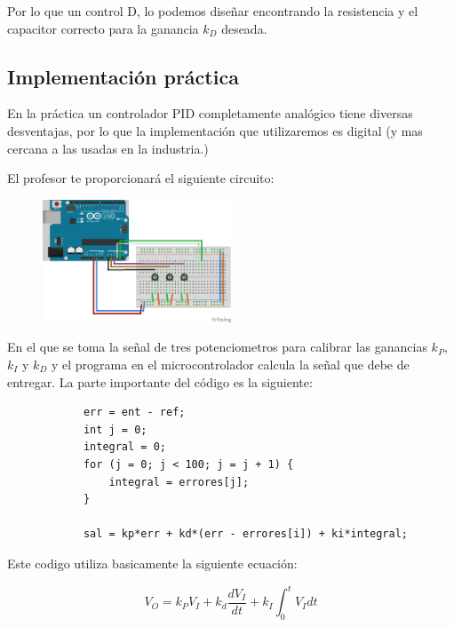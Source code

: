 			Por lo que un control D, lo podemos diseñar encontrando la resistencia y el capacitor correcto para la ganancia $k_D$ deseada.


	\subsection{Implementación práctica}

		En la práctica un controlador PID completamente analógico tiene diversas desventajas, por lo que la implementación que utilizaremos es digital (y mas cercana a las usadas en la industria.)

		El profesor te proporcionará el siguiente circuito:

		\begin{figure}[h]
			\begin{center}
				\includegraphics[width=0.5\textwidth]{images/ControlPID.png}
			\end{center}
		\end{figure}

		En el que se toma la señal de tres potenciometros para calibrar las ganancias $k_P$, $k_I$ y $k_D$ y el programa en el microcontrolador calcula la señal que debe de entregar. La parte importante del código es la siguiente:

		\begin{verbatim}
			err = ent - ref;
			int j = 0;
			integral = 0;
			for (j = 0; j < 100; j = j + 1) {
				integral = errores[j];
			}

			sal = kp*err + kd*(err - errores[i]) + ki*integral;
		\end{verbatim}

		Este codigo utiliza basicamente la siguiente ecuación:

		\begin{equation}
			V_O = k_P V_I + k_d \frac{d V_I}{dt} + k_I \int_0^t V_I dt
		\end{equation}

